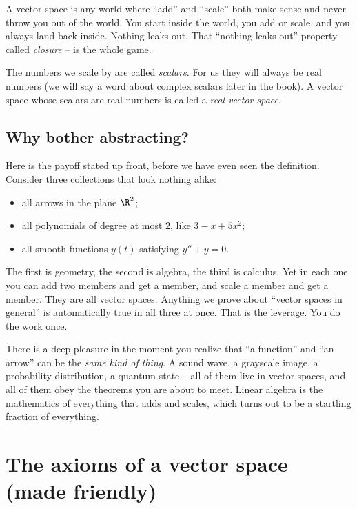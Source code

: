 \begin{intuitionbox}
A vector space is any world where ``add'' and ``scale'' both make sense and never throw
you out of the world. You start inside the world, you add or scale, and you always land
back inside. Nothing leaks out. That ``nothing leaks out'' property -- called
\emph{closure} -- is the whole game.
\end{intuitionbox}

The numbers we scale by are called \emph{scalars}. For us they will always be real
numbers (we will say a word about complex scalars later in the book). A vector space whose
scalars are real numbers is called a \emph{real vector space}.

\subsection{Why bother abstracting?}

Here is the payoff stated up front, before we have even seen the definition. Consider
three collections that look nothing alike:

\begin{itemize}
  \item all arrows in the plane $\R^2$;
  \item all polynomials of degree at most $2$, like $3 - x + 5x^2$;
  \item all smooth functions $y(t)$ satisfying $y'' + y = 0$.
\end{itemize}

The first is geometry, the second is algebra, the third is calculus. Yet in each one you
can add two members and get a member, and scale a member and get a member. They are all
vector spaces. Anything we prove about ``vector spaces in general'' is automatically true
in all three at once. That is the leverage. You do the work once.

\begin{aestheticbox}
There is a deep pleasure in the moment you realize that ``a function'' and ``an arrow''
can be the \emph{same kind of thing}. A sound wave, a grayscale image, a probability
distribution, a quantum state -- all of them live in vector spaces, and all of them obey
the theorems you are about to meet. Linear algebra is the mathematics of everything that
adds and scales, which turns out to be a startling fraction of everything.
\end{aestheticbox}

\section{The axioms of a vector space (made friendly)}

